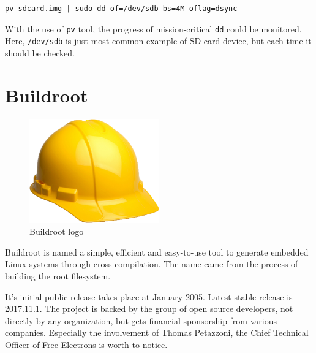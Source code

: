 \documentclass[printmode]{mgr}
\begin{document}
\begin{lstlisting}
pv sdcard.img | sudo dd of=/dev/sdb bs=4M oflag=dsync
\end{lstlisting}

With the use of \verb|pv| tool, the progress of mission-critical \verb|dd| could be monitored. Here, \verb|/dev/sdb| is just most common example of SD card device, but each time it should be checked.












\section{Buildroot}


\begin{figure}[htbp]
  \centering
    \includegraphics[width=0.5\textwidth]{buildroot-logo.png}
    \caption{Buildroot logo}
  \label{fig:buildroot-logo}
\end{figure}

Buildroot is named a simple, efficient and easy-to-use tool to generate embedded Linux systems through cross-compilation. The name came from the process of building the root filesystem.

It's initial public release takes place at January 2005. Latest stable release is 2017.11.1. The project is backed by the group of open source developers, not directly by any organization, but gets financial sponsorship from various companies. Especially the involvement of Thomas Petazzoni, the Chief Technical Officer of Free Electrons is worth to notice.\cite{web:buildroot-tpetazzoni}
\end{document}
